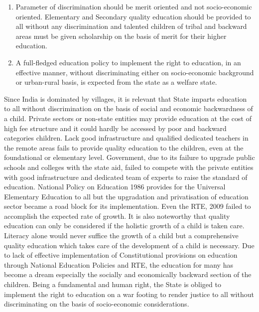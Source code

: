 \begin{multicols}{2}
\begin{enumerate}[label=$-$]
\item Parameter of discrimination should be merit oriented and not socio-economic
oriented. Elementary and Secondary quality education should be provided to all
without any discrimination and talented children of tribal and backward areas
must be given scholarship on the basis of merit for their higher education.

\item A full-fledged education policy to implement the right to education, in an
effective manner, without discriminating either on socio-economic background or
urban-rural basis, is expected from the state as a welfare state.
\end{enumerate}

\vspace{-.25cm}


\vspace{-.1cm}

\noi
Since India is dominated by villages, it is relevant that State imparts education to all without
discrimination on the basis of social and economic backwardness of a child. Private sectors or
non-state entities may provide education at the cost of high fee structure and it could hardly
be accessed by poor and backward categories children. Lack good infrastructure and qualified
dedicated teachers in the remote areas fails to provide quality education to the children, even
at the foundational or elementary level. Government, due to its failure to upgrade public
schools and colleges with the state aid, failed to compete with the private entities with good
infrastructure and dedicated team of experts to raise the standard of education. National
Policy on Education 1986 provides for the Universal Elementary Education to all but the upgradation and privatisation of education sector became a road block for its implementation.
Even the RTE, 2009 failed to accomplish the expected rate of growth. It is also noteworthy
that quality education can only be considered if the holistic growth of a child is taken care.
Literacy alone would never suffice the growth of a child but a comprehensive quality
education which takes care of the development of a child is necessary. Due to lack of
effective implementation of Constitutional provisions on education through National Education Policies and RTE, the education for many has become a dream especially the
socially and economically backward section of the children. Being a fundamental and human
right, the State is obliged to implement the right to education on a war footing to render
justice to all without discriminating on the basis of socio-economic considerations.

\end{multicols}
\label{end2019-art2}
